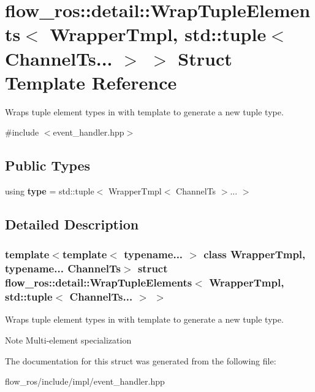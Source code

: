 \hypertarget{structflow__ros_1_1detail_1_1_wrap_tuple_elements_3_01_wrapper_tmpl_00_01std_1_1tuple_3_01_channel_ts_8_8_8_01_4_01_4}{}\section{flow\+\_\+ros\+:\+:detail\+:\+:Wrap\+Tuple\+Elements$<$ Wrapper\+Tmpl, std\+:\+:tuple$<$ Channel\+Ts... $>$ $>$ Struct Template Reference}
\label{structflow__ros_1_1detail_1_1_wrap_tuple_elements_3_01_wrapper_tmpl_00_01std_1_1tuple_3_01_channel_ts_8_8_8_01_4_01_4}


Wraps tuple element types in with template to generate a new tuple type.  




{\ttfamily \#include $<$event\+\_\+handler.\+hpp$>$}

\subsection*{Public Types}
\begin{DoxyCompactItemize}
\item 
\mbox{\label{structflow__ros_1_1detail_1_1_wrap_tuple_elements_3_01_wrapper_tmpl_00_01std_1_1tuple_3_01_channel_ts_8_8_8_01_4_01_4_a8b43c21ef0ca93eef58f776f944eb100}} 
using {\bfseries type} = std\+::tuple$<$ Wrapper\+Tmpl$<$ Channel\+Ts $>$... $>$
\end{DoxyCompactItemize}


\subsection{Detailed Description}
\subsubsection*{template$<$template$<$ typename... $>$ class Wrapper\+Tmpl, typename... Channel\+Ts$>$\newline
struct flow\+\_\+ros\+::detail\+::\+Wrap\+Tuple\+Elements$<$ Wrapper\+Tmpl, std\+::tuple$<$ Channel\+Ts... $>$ $>$}

Wraps tuple element types in with template to generate a new tuple type. 

\begin{DoxyNote}{Note}
Multi-\/element specialization 
\end{DoxyNote}


The documentation for this struct was generated from the following file\+:\begin{DoxyCompactItemize}
\item 
flow\+\_\+ros/include/impl/event\+\_\+handler.\+hpp\end{DoxyCompactItemize}
